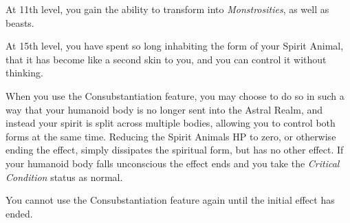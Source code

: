 {
	At 11th level, you gain the ability to transform into {\it Monstrosities}, as well as beasts. 
}

{
	At 15th level, you have spent so long inhabiting the form of your Spirit Animal, that it has become like a second skin to you, and you can control it without thinking. 
	
	When you use the Consubstantiation feature, you may choose to do so in such a way that your humanoid body is no longer sent into the Astral Realm, and instead your spirit is split across multiple bodies, allowing you to control both forms at the same time. Reducing the Spirit Animal\apos{}s HP to zero, or otherwise ending the effect, simply dissipates the spiritual form, but has no other effect. If your humanoid body falls unconscious the effect ends and you take the {\it Critical Condition} status as normal. 
	
	You cannot use the Consubstantiation feature again until the initial effect has ended. 
}


 
